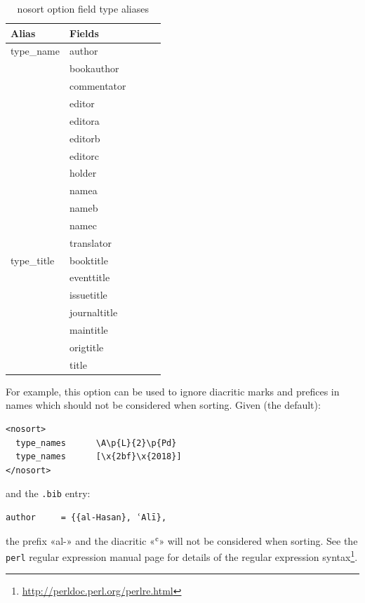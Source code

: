 \documentclass{ltxdockit}
\begin{document}
\begin{table}
\begin{center}
\small
\begin{tabular}{lllll}
\toprule
Alias & Fields\\
\midrule
type\_name & author\\
          & bookauthor\\
          & commentator\\
          & editor\\
          & editora\\
          & editorb\\
          & editorc\\
          & holder\\
          & namea\\
          & nameb\\
          & namec\\
          & translator\\
type\_title & booktitle\\
           & eventtitle\\
           & issuetitle\\
           & journaltitle\\
           & maintitle\\
           & origtitle\\
           & title\\
\bottomrule
\end{tabular}
\end{center}
\caption{nosort option field type aliases}
\label{tab:nst}
\end{table}

For example, this option can be used to ignore diacritic marks and prefices
in names which should not be considered when sorting. Given (the default):

\begin{verbatim}
<nosort>
  type_names      \A\p{L}{2}\p{Pd}
  type_names      [\x{2bf}\x{2018}]
</nosort>
\end{verbatim}

and the \verb+.bib+ entry:

\begin{verbatim}
author	   = {{al-Hasan}, ʿAlī},
\end{verbatim}

\noindent the prefix «al-» and the diacritic «ʿ» will not be considered
when sorting. See the \verb+perl+ regular expression manual page for
details of the regular expression syntax\footnote{\url{http://perldoc.perl.org/perlre.html}}.
\end{document}
